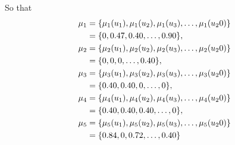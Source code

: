 \documentclass[a4paper,openany]{book}
\begin{document}
				So that
				\begin{align}
					\mu_1 &= \{ \mu_1(u_1), \mu_1(u_2), \mu_1(u_3),\dots,\mu_1(u_20) \} \\
					&= \{ 0, 0.47, 0.40,\dots,0.90 \} \notag ,\\
					\mu_2 &= \{ \mu_2(u_1), \mu_2(u_2), \mu_2(u_3),\dots,\mu_2(u_20) \}\\
					&= \{ 0, 0, 0,\dots,0.40 \} \notag ,\\
					\mu_3 &= \{ \mu_3(u_1), \mu_3(u_2), \mu_3(u_3),\dots,\mu_3(u_20) \}\\
					&= \{ 0.40, 0.40, 0,\dots,0 \} \notag ,\\
					\mu_4 &= \{ \mu_4(u_1), \mu_4(u_2), \mu_4(u_3),\dots,\mu_4(u_20) \}\\
					&= \{ 0.40, 0.40, 0.40,\dots,0 \} \notag ,\\
					\mu_5 &= \{ \mu_5(u_1), \mu_5(u_2), \mu_5(u_3),\dots,\mu_5(u_20) \}\\
					&= \{ 0.84, 0, 0.72,\dots,0.40 \} \notag					
				\end{align}
				
\end{document}
